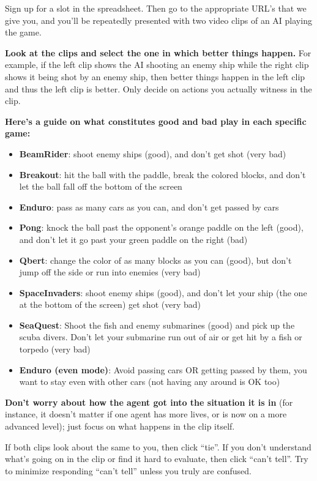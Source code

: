 \documentclass{article}
\begin{document}
Sign up for a slot in the spreadsheet.
Then go to the appropriate URL's that we give you,
and you'll be repeatedly presented with two video clips of an AI playing the game.

\textbf{Look at the clips and select the one in which better things happen.}
For example, if the left clip shows the AI shooting an enemy ship
while the right clip shows it being shot by an enemy ship,
then better things happen in the left clip and thus the left clip is better.
Only decide on actions you actually witness in the clip.

\textbf{Here’s a guide on what constitutes good and bad play in each specific game:}

\begin{itemize}
\item \textbf{BeamRider}: shoot enemy ships (good), and don’t get shot (very bad)
\item \textbf{Breakout}: hit the ball with the paddle, break the colored blocks, and don’t let the ball fall off the bottom of the screen
\item \textbf{Enduro}: pass as many cars as you can, and don’t get passed by cars
\item \textbf{Pong}: knock the ball past the opponent’s orange paddle on the left (good), and don’t let it go past your green paddle on the right (bad)
\item \textbf{Qbert}: change the color of as many blocks as you can (good), but don’t jump off the side or run into enemies (very bad)
\item \textbf{SpaceInvaders}: shoot enemy ships (good), and don’t let your ship (the one at the bottom of the screen) get shot (very bad)
\item \textbf{SeaQuest}: Shoot the fish and enemy submarines (good) and pick up the scuba divers. Don’t let your submarine run out of air or get hit by a fish or torpedo (very bad)
\item \textbf{Enduro (even mode)}: Avoid passing cars OR getting passed by them, you want to stay even with other cars (not having any around is OK too)
\end{itemize}

\textbf{Don't worry about how the agent got into the situation it is in}
(for instance, it doesn't matter if one agent has more lives,
or is now on a more advanced level);
just focus on what happens in the clip itself. 

If both clips look about the same to you, then click ``tie''.
If you don't understand what's going on in the clip or find it hard to evaluate,
then click ``can't tell''.
Try to minimize responding ``can't tell'' unless you truly are confused.
\end{document}

